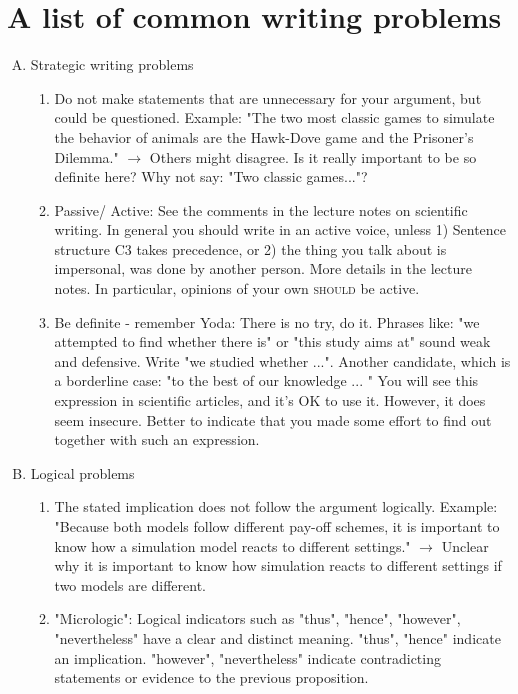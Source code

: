 \documentclass{tufte-book}
\begin{document}
\section{A list of common writing problems}


\begin{enumerate}[(A)]


\item Strategic writing problems
\begin{enumerate}
	\item Do not make statements that are unnecessary for your argument, but could be questioned. 
	Example: "The two most classic games to simulate the behavior of animals are the Hawk-Dove game and the Prisoner's Dilemma." $\rightarrow$ Others might disagree. Is it really important to be so definite here? Why not say: "Two classic games..."?
	\item Passive/ Active: See the comments in the lecture notes on scientific writing. In general you should write in an active voice, unless  1) Sentence structure C3 takes precedence, or 2) the thing you talk about is impersonal, was done by another person. More details in the lecture notes. In particular, opinions of your own \textsc{should} be active.
	\item Be definite - remember Yoda: There is no try, do it. Phrases like: "we attempted to find whether there is" or "this study aims at" sound weak and defensive. Write "we studied whether ...". Another candidate, which is a borderline case: "to the best of our knowledge ... " You will see this expression in scientific articles, and it's OK to use it. However, it does seem insecure. Better to indicate that you made some effort to find out together with such an expression. 	
	
 

\end{enumerate}

\item Logical problems
\begin{enumerate}
	\item The stated implication does not follow the argument logically. Example: "Because both models follow different pay-off schemes, it is important to know how a simulation model reacts to different settings." $\rightarrow$ Unclear why it is important to know how simulation reacts to different settings if two models are different.
	\item "Micrologic": Logical indicators such as "thus", "hence", "however", "nevertheless" have a clear and distinct meaning. "thus", "hence" indicate an implication. "however", "nevertheless" indicate contradicting statements or evidence to the previous proposition.
\end{enumerate}



\end{enumerate}
\end{document}
